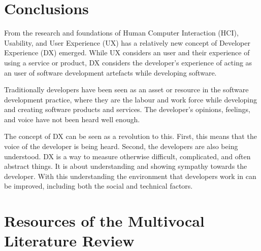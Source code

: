 \documentclass[english, 12pt, a4paper, sci, utf8, a-1b, online]{aaltothesis}
\begin{document}
\clearpage
\section{Conclusions} \label{section:conclusions}

From the research and foundations of Human Computer Interaction (HCI), Usability, and User Experience (UX) has a relatively new concept of Developer Experience (DX) emerged. While UX considers an user and their experience of using a service or product, DX considers the developer's experience of acting as an user of software development artefacts while developing software.

Traditionally developers have been seen as an asset or resource in the software development practice, where they are the labour and work force while developing and creating software products and services. The developer's opinions, feelings, and voice have not been heard well enough.

The concept of DX can be seen as a revolution to this. First, this means that the voice of the developer is being heard. Second, the developers are also being understood. DX is a way to measure otherwise difficult, complicated, and often abstract things. It is about understanding and showing sympathy towards the developer. With this understanding the environment that developers work in can be improved, including both the social and technical factors.

\clearpage
\thesisbibliography
\printbibliography

\clearpage
\thesisappendix

\section{Resources of the Multivocal Literature Review}

\renewcommand{\arraystretch}{1.5}
\end{document}
